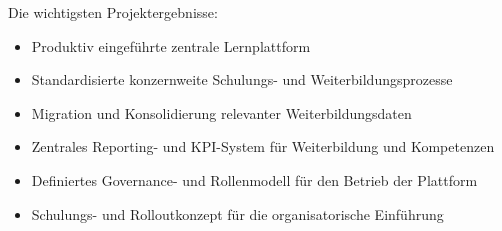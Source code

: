 Die wichtigsten Projektergebnisse:

\begin{itemize}
    \item Produktiv eingeführte zentrale Lernplattform
    \item Standardisierte konzernweite Schulungs- und Weiterbildungsprozesse
    \item Migration und Konsolidierung relevanter Weiterbildungsdaten
    \item Zentrales Reporting- und \ac{KPI}-System für Weiterbildung und Kompetenzen
    \item Definiertes Governance- und Rollenmodell für den Betrieb der Plattform
    \item Schulungs- und Rolloutkonzept für die organisatorische Einführung
\end{itemize}
